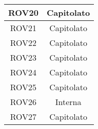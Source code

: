 \begin{longtable}{|c|c|}
\midrule
ROV20
& Capitolato\\

\midrule
ROV21
& Capitolato\\

\midrule
ROV22
& Capitolato\\

\midrule
ROV23
& Capitolato\\

\midrule
ROV24
& Capitolato\\

\midrule
ROV25
& Capitolato\\

\midrule
ROV26
& Interna\\

\midrule
ROV27
& Capitolato\\

\end{longtable}

\newpage
